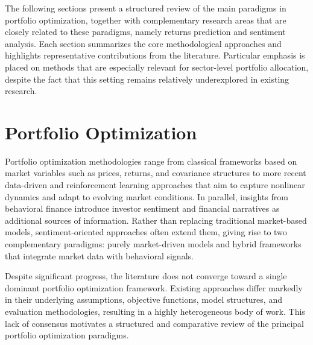 The following sections present a structured review of the main paradigms in portfolio optimization, together with complementary research areas that are closely related to these paradigms, namely returns prediction and sentiment analysis. Each section summarizes the core methodological approaches and highlights representative contributions from the literature. Particular emphasis is placed on methods that are especially relevant for sector-level portfolio allocation, despite the fact that this setting remains relatively underexplored in existing research.

\section{Portfolio Optimization}
\label{section:portfolio_optimization}

Portfolio optimization methodologies range from classical frameworks based on market variables such as prices, returns, and covariance structures to more recent data-driven and reinforcement learning approaches that aim to capture nonlinear dynamics and adapt to evolving market conditions. In parallel, insights from behavioral finance introduce investor sentiment and financial narratives as additional sources of information. Rather than replacing traditional market-based models, sentiment-oriented approaches often extend them, giving rise to two complementary paradigms: purely market-driven models and hybrid frameworks that integrate market data with behavioral signals.


Despite significant progress, the literature does not converge toward a single dominant portfolio optimization framework. Existing approaches differ markedly in their underlying assumptions, objective functions, model structures, and evaluation methodologies, resulting in a highly heterogeneous body of work. This lack of consensus motivates a structured and comparative review of the principal portfolio optimization paradigms.

